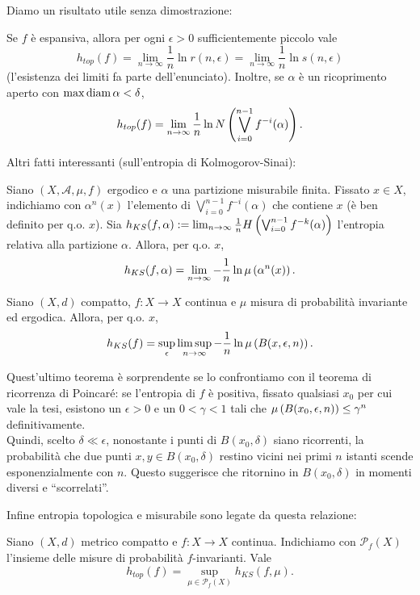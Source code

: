 Diamo un risultato utile senza dimostrazione:

\begin{teo}Se $f$ è espansiva, allora per ogni $\epsilon>0$ sufficientemente piccolo vale
\[ h_{top}(f)=\lim_{n\to\infty}\frac{1}{n}\ln r(n,\epsilon)=\lim_{n\to\infty}\frac{1}{n}\ln s(n,\epsilon) \]
(l'esistenza dei limiti fa parte dell'enunciato). Inoltre, se $\alpha$ è un ricoprimento aperto con $\max\operatorname{diam} \alpha<\delta$,
\[ h_{top}(f)=\lim_{n\to\infty}\frac{1}{n}\ln N\left(\bigvee_{i=0}^{n-1}f^{-i}(\alpha)\right). \]
\end{teo}

Altri fatti interessanti (sull'entropia di Kolmogorov-Sinai):

\begin{teo}Siano $(X,\mathcal{A},\mu,f)$ ergodico e $\alpha$ una partizione misurabile finita.
Fissato $x\in X$, indichiamo con $\alpha^n(x)$ l'elemento di $\bigvee_{i=0}^{n-1}f^{-i}(\alpha)$ che contiene $x$
(è ben definito per q.o. $x$). Sia $h_{KS}(f,\alpha):=\lim_{n\to\infty}\frac{1}{n}H\left(\bigvee_{i=0}^{n-1}f^{-k}(\alpha)\right)$
l'entropia relativa alla partizione $\alpha$. Allora, per q.o. $x$,
\[ h_{KS}(f,\alpha)=\lim_{n\to\infty}-\frac{1}{n}\ln \mu\left(\alpha^n(x)\right). \]
\end{teo}

\begin{teo}Siano $(X,d)$ compatto, $f:X\to X$ continua e $\mu$ misura di probabilità invariante ed ergodica.
Allora, per q.o. $x$,
\[ h_{KS}(f)=\sup_\epsilon\limsup_{n\to\infty}-\frac{1}{n}\ln\mu\left(B(x,\epsilon,n)\right). \]
\end{teo}

Quest'ultimo teorema è sorprendente se lo confrontiamo con il teorema di ricorrenza di Poincaré:
se l'entropia di $f$ è positiva, fissato qualsiasi $x_0$ per cui vale la tesi, esistono un $\epsilon>0$ e un $0<\gamma<1$ tali che
$\mu\left(B(x_0,\epsilon,n)\right)\le \gamma^n$ definitivamente. \\
Quindi, scelto $\delta\ll\epsilon$, nonostante i punti di $B(x_0,\delta)$ siano ricorrenti, la probabilità che
due punti $x,y\in B(x_0,\delta)$ restino vicini nei primi $n$ istanti scende esponenzialmente con $n$.
Questo suggerisce che ritornino in $B(x_0,\delta)$ in momenti diversi e ``scorrelati''.

Infine entropia topologica e misurabile sono legate da questa relazione:
\begin{teo}Siano $(X,d)$ metrico compatto e $f:X\to X$ continua. Indichiamo con $\mathcal{P}_f(X)$ l'insieme
delle misure di probabilità $f$-invarianti. Vale
\[ h_{top}(f)=\sup_{\mu\in\mathcal{P}_f(X)}h_{KS}(f,\mu). \]
\end{teo}

